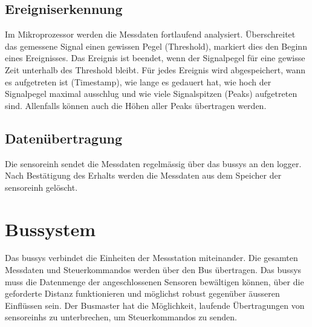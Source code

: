 \subsection{Ereigniserkennung}
Im Mikroprozessor werden die Messdaten fortlaufend analysiert. Überschreitet das gemessene Signal einen gewissen Pegel (Threshold), markiert dies den Beginn eines Ereignisses. Das Ereignis ist beendet, wenn der Signalpegel für eine gewisse Zeit unterhalb des Threshold bleibt. Für jedes Ereignis wird abgespeichert, wann es aufgetreten ist (Timestamp), wie lange es gedauert hat, wie hoch der Signalpegel maximal ausschlug und wie viele Signalspitzen (Peaks) aufgetreten sind. Allenfalls können auch die Höhen aller Peaks übertragen werden.

\subsection{Datenübertragung}
Die \gls{sensoreinh} sendet die Messdaten regelmässig über das \gls{bussys} an den \gls{logger}. Nach Bestätigung des Erhalts werden die Messdaten aus dem Speicher der \gls{sensoreinh} gelöscht.

\section{Bussystem}
Das \gls{bussys} verbindet die Einheiten der Messstation miteinander. Die gesamten Messdaten und Steuerkommandos werden über den Bus übertragen. Das \gls{bussys} muss die Datenmenge der angeschlossenen Sensoren bewältigen können, über die geforderte Distanz funktionieren und möglichst robust gegenüber äusseren Einflüssen sein. Der Busmaster hat die Möglichkeit, laufende Übertragungen von \glspl{sensoreinh} zu unterbrechen, um Steuerkommandos zu senden.